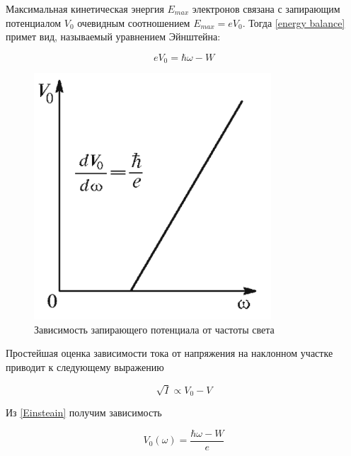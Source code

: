 \documentclass[12pt,a4paper]{article}
\begin{document}
	Максимальная кинетическая энергия $ E_{max} $ электронов связана с запирающим потенциалом $ V_0 $ очевидным соотношением $ E_{max} = eV_0 $. Тогда \eqref{energy balance} примет вид, называемый уравнением Эйнштейна:
	
	\begin{equation}\label{Einsteain}
	eV_0 = \hbar\omega - W 
	\end{equation}
	
	
	\begin{figure}
	\includegraphics[width=\linewidth]{5.1.1-2}
	\vspace{-2ex}
		\caption{Зависимость запирающего потенциала
			от частоты света}
		\label{ris V(w)}
	\end{figure}
		
	
	Простейшая оценка зависимости тока от напряжения на наклонном участке приводит к следующему выражению
	
	\begin{equation}\label{sqrt I = V}
	\sqrt{I} \propto V_0 - V
	\end{equation}
	
Из \eqref{Einsteain} получим зависимость 
	
	\begin{equation}\label{V(w)}
	V_0 (\omega) = \dfrac{\hbar\omega - W}{e}
	\end{equation}
\end{document}
